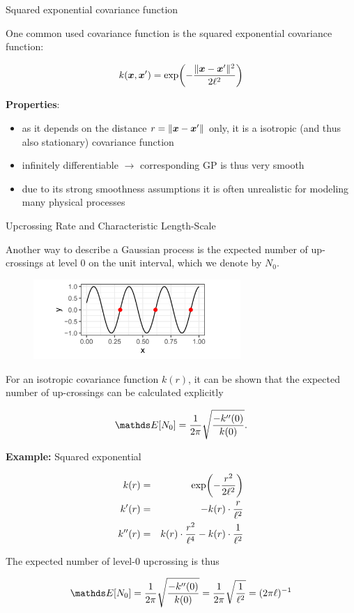 \begin{vbframe}{Squared exponential covariance function}

One common used covariance function is the squared exponential covariance function:

$$
k(\bm{x}, \bm{x}^\prime) = \exp\biggl(- \frac{\|\bm{x} - \bm{x}^\prime\|^2}{2\ell^2}\biggr)
$$

\textbf{Properties}:
\begin{itemize}
\item as it depends on the distance $r = \|\bm{x} - \bm{x}^\prime\|$ only, it is a isotropic (and thus also stationary) covariance function
\item infinitely differentiable $\to$ corresponding GP is thus very smooth
\item due to its strong smoothness assumptions it is often unrealistic for modeling many physical processes

\end{itemize}

\end{vbframe}

\begin{vbframe}{Upcrossing Rate and Characteristic Length-Scale}
  
Another way to describe a Gaussian process is the expected number of up-crossings at level $0$ on the unit interval, which we denote by $N_0$. 

\begin{figure}
  \includegraphics[width=0.7\textwidth]{figure_man/up-crossings.png}
\end{figure}

For an isotropic covariance function $k(r)$, it can be shown that the expected number of up-crossings can be calculated explicitly

$$
\E[N_0] = \frac{1}{2\pi} \sqrt{\frac{- k^{\prime \prime}(0)}{k(0)}}.
$$

\framebreak

\textbf{Example:} Squared exponential

\begin{eqnarray*}
k(r) &=& \exp\biggl(-\frac{r^2}{2\ell^2}\biggr)\\
k^\prime(r) &=& - k(r) \cdot \frac{r}{\ell^2} \\
k^{\prime\prime}(r) &=&  k(r) \cdot \frac{r^2}{\ell^4} - k(r) \cdot \frac{1}{\ell^2}
\end{eqnarray*}

The expected number of level-0 upcrossing is thus

$$
\E[N_0] = \frac{1}{2\pi} \sqrt{\frac{- k^{\prime\prime}(0)}{k(0)}} = \frac{1}{2\pi} \sqrt{\frac{1}{\ls^2}} = (2\pi \ls)^{-1}
$$


\end{vbframe} 

\endlecture

